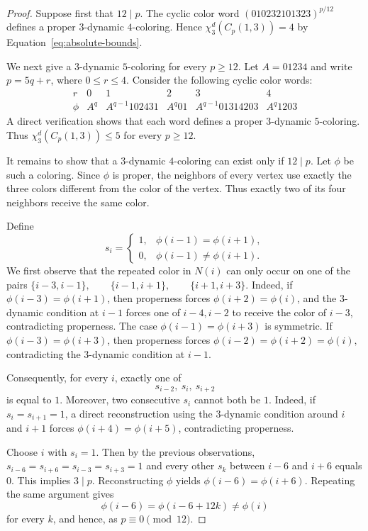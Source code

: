 \documentclass[10pt,a4paper]{article}
\theoremstyle{case}
\numberwithin{subcase}{case}
\begin{document}
\begin{proof}
Suppose first that $12\mid p$. The cyclic color word
$
(010232101323)^{p/12}
$
defines a proper $3$-dynamic $4$-coloring. Hence
$\chi_3^d(C_p(1,3))=4$ by
Equation~\ref{eq:absolute-bounds}.

We next give a $3$-dynamic $5$-coloring for every $p\ge12$.
Let $A=01234$ and write $p=5q+r$, where $0\le r\le4$.
Consider the following cyclic color words:
\[
\begin{array}{c|ccccc}
r&0&1&2&3&4\\ \hline
\phi&
A^q&
A^{q-1}102431&
A^q01&
A^{q-1}01314203&
A^q1203
\end{array}
\]
A direct verification shows that each word defines a proper
$3$-dynamic $5$-coloring. Thus
$
\chi_3^d(C_p(1,3))\le5
$
for every $p\ge12$.

It remains to show that a $3$-dynamic $4$-coloring can exist only if
$12\mid p$. Let $\phi$ be such a coloring. Since $\phi$ is proper,
the neighbors of every vertex use exactly the three colors different
from the color of the vertex. Thus exactly two of its four neighbors
receive the same color.

Define
\[
s_i=
\begin{cases}
1,&\phi(i-1)=\phi(i+1),\\
0,&\phi(i-1)\neq\phi(i+1).
\end{cases}
\]
We first observe that the repeated color in $N(i)$ can only occur on
one of the pairs
$
\{i-3,i-1\},\qquad
\{i-1,i+1\},\qquad
\{i+1,i+3\}.
$
Indeed, if $\phi(i-3)=\phi(i+1)$, then properness forces
$\phi(i+2)=\phi(i)$, and the $3$-dynamic condition at $i-1$ forces
one of $i-4,i-2$ to receive the color of $i-3$, contradicting
properness. The case $\phi(i-1)=\phi(i+3)$ is symmetric. If
$\phi(i-3)=\phi(i+3)$, then properness forces
$
\phi(i-2)=\phi(i+2)=\phi(i),
$
contradicting the $3$-dynamic condition at $i-1$.

Consequently, for every $i$, exactly one of
\[
s_{i-2},\ s_i,\ s_{i+2}
\]
is equal to $1$. Moreover, two consecutive $s_i$ cannot both be $1$.
Indeed, if $s_i=s_{i+1}=1$, a direct reconstruction using the
$3$-dynamic condition around $i$ and $i+1$ forces
$\phi(i+4)=\phi(i+5)$, contradicting properness.

Choose $i$ with $s_i=1$. Then by the previous
observations, $s_{i-6}=s_{i+6}=s_{i-3}=s_{i+3}=1$ and every other $s_k$ between $i-6$ and $i+6$ equals 0.
This implies $3\mid p$.
Reconstructing $\phi$ yields
$\phi(i-6)=\phi(i+6)$.
Repeating the same argument gives
\[
\phi(i-6)=\phi(i-6+12k) \neq \phi(i)
\]
for every $k$, and hence, as $p\equiv0\pmod {12}$.
\end{proof}
\end{document}
